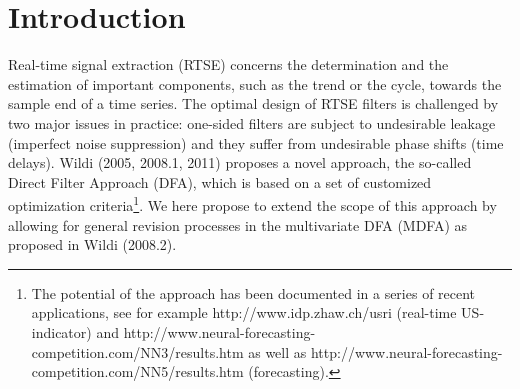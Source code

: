 \documentclass[11pt]{article}
\begin{document}
\section{Introduction}

Real-time signal extraction (RTSE) concerns the determination and the estimation of important components, such as the trend or the cycle, towards the sample end of a time series. The optimal design of RTSE filters is challenged by two major issues in practice: one-sided filters are subject to undesirable leakage (imperfect noise suppression) and they suffer from undesirable phase shifts (time delays). Wildi (2005, 2008.1, 2011) proposes a novel approach, the so-called Direct Filter Approach (DFA), which is based on a set of customized optimization criteria\footnote{\label{perf}The potential of the approach has been documented in a series of recent applications, see for example http://www.idp.zhaw.ch/usri (real-time US-indicator) and http://www.neural-forecasting-competition.com/NN3/results.htm as well as http://www.neural-forecasting-competition.com/NN5/results.htm (forecasting).}. We here propose to extend the scope of this approach by allowing for general revision processes in the multivariate DFA (MDFA) as proposed in Wildi (2008.2). \\
\end{document}
